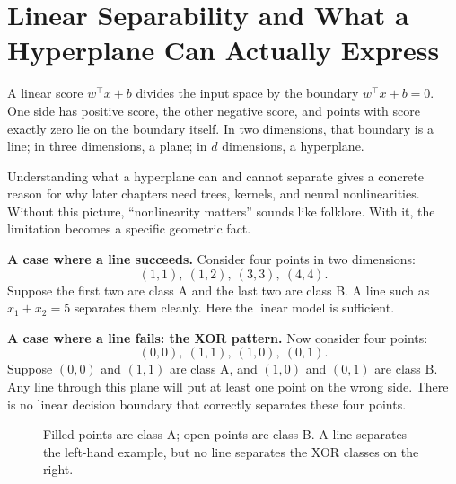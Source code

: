 \section*{Linear Separability and What a Hyperplane Can Actually Express}

A linear score $w^\top x + b$ divides the input space by the boundary $w^\top x + b = 0$. One side has positive score, the other negative score, and points with score exactly zero lie on the boundary itself. In two dimensions, that boundary is a line; in three dimensions, a plane; in $d$ dimensions, a hyperplane.

Understanding what a hyperplane can and cannot separate gives a concrete reason for why later chapters need trees, kernels, and neural nonlinearities. Without this picture, ``nonlinearity matters'' sounds like folklore. With it, the limitation becomes a specific geometric fact.

\textbf{A case where a line succeeds.} Consider four points in two dimensions:
\[
(1,1),\ (1,2),\ (3,3),\ (4,4).
\]
Suppose the first two are class A and the last two are class B. A line such as $x_1 + x_2 = 5$ separates them cleanly. Here the linear model is sufficient.

\textbf{A case where a line fails: the XOR pattern.} Now consider four points:
\[
(0,0),\ (1,1),\ (1,0),\ (0,1).
\]
Suppose $(0,0)$ and $(1,1)$ are class A, and $(1,0)$ and $(0,1)$ are class B. Any line through this plane will put at least one point on the wrong side. There is no linear decision boundary that correctly separates these four points.

\begin{figure}[t]
\centering
{}
\caption{Filled points are class A; open points are class B. A line separates the left-hand example, but no line separates the XOR classes on the right.}
\label{fig:linear-separability}
\end{figure}

